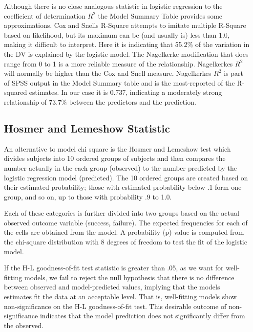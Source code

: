 \documentclass[a4paper,12pt]{article}
\begin{document}
Although there is no close analogous statistic in logistic regression to
the coefficient of determination $R^2$ the Model Summary Table provides some approximations. Cox and Snells R-Square attempts to imitate multiple R-Square based on likelihood, but its maximum can be (and usually is) less than 1.0, making it difficult to interpret. Here it is indicating that 55.2\% of the variation in the DV is explained by the
logistic model. The Nagelkerke modification that does range from 0 to 1 is a more reliable
measure of the relationship. Nagelkerkes $R^2$ will normally be higher than the Cox and Snell measure. Nagelkerkes $R^2$ is part of SPSS output in the Model Summary table and is the most-reported of the R-squared estimates. In our case it is 0.737, indicating a moderately strong relationship of 73.7\% between the predictors and the prediction.
\newpage
\subsection{Hosmer and Lemeshow  Statistic}
An alternative to model chi square is the Hosmer and Lemeshow test
which divides subjects into 10 ordered groups of subjects and then compares the number
actually in the each group (observed) to the number predicted by the logistic regression
model (predicted). The 10 ordered groups are created based on their estimated probability; those with estimated probability below .1 form one group, and so on, up to those with probability .9 to 1.0.

Each of these categories is further divided into two groups based on the actual observed outcome variable (success, failure). The expected frequencies for each of the cells are obtained from the model. A probability (p) value is
computed from the chi-square distribution with 8 degrees of freedom to test the fit of the logistic model.

If the H-L goodness-of-fit test statistic is greater than .05, as we want for well-fitting models, we fail to reject the null hypothesis that there is no difference between observed and model-predicted values, implying that the models estimates fit the data at an acceptable level. That is, well-fitting models show non-significance on the
H-L goodness-of-fit test. This desirable outcome of non-significance indicates that the
model prediction does not significantly differ from the observed.
\end{document}
